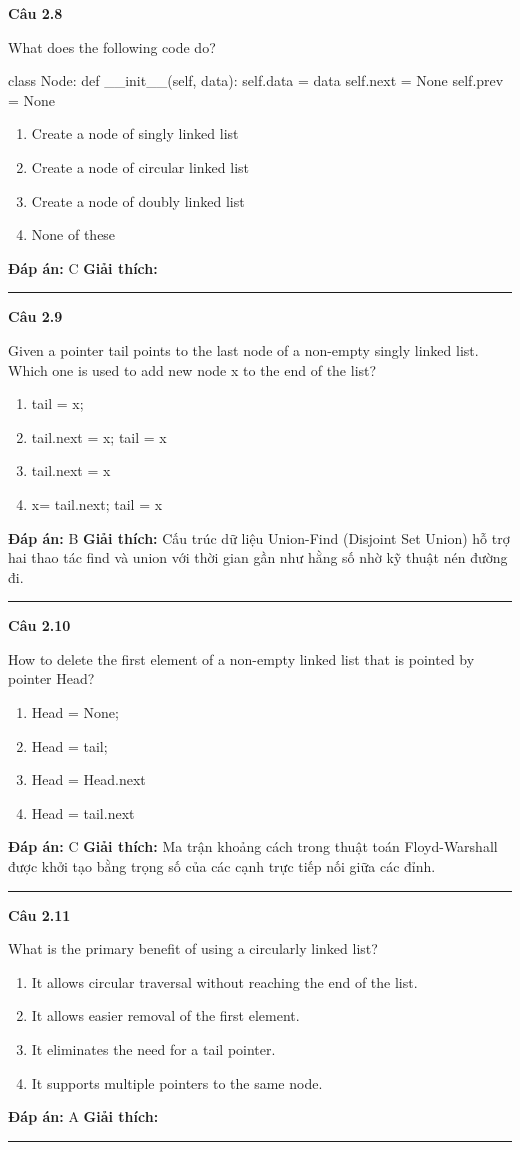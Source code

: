 \documentclass[11pt,a4paper]{article}
\newenvironment{question}[1]{%
  \par\vspace{1em}\noindent\textbf{\large Câu #1}\par\vspace{0.4em}
}{%
  \par\vspace{1em}\hrule\vspace{0.6em}
}
\newenvironment{choices}{%
  \begin{enumerate}[label=\textbf{\Alph*.},leftmargin=2.2em,itemsep=2pt,topsep=3pt]
}{%
  \end{enumerate}
}
\newcommand{\choice}{\item}
\newenvironment{codebox}{%
  \begin{tcolorbox}[colback=gray!8!white,colframe=gray!50!black,arc=1.5mm,boxrule=0.6pt,left=3mm,right=3mm,top=2.5mm,bottom=2.5mm]
  \ttfamily\small
}{%
  \end{tcolorbox}
}
\begin{document}
\begin{question}{2.8}
What does the following code do?
\begin{codebox}
class Node:
    def __init__(self, data):
        self.data = data
        self.next = None
        self.prev = None
\end{codebox}
\begin{choices}
\choice Create a node of singly linked list
\choice Create a node of circular linked list
\choice Create a node of doubly linked list
\choice None of these
\end{choices}
\textbf{Đáp án:} C
\textbf{Giải thích:} 
\end{question}

\begin{question}{2.9}
Given a pointer tail points to the last node of a non-empty singly linked list. Which one is used to add new node x to the end of the list?
\begin{choices}
\choice tail = x;
\choice tail.next = x; tail = x
\choice tail.next = x
\choice x= tail.next; tail = x
\end{choices}
\textbf{Đáp án:} B
\textbf{Giải thích:} Cấu trúc dữ liệu Union-Find (Disjoint Set Union) hỗ trợ hai thao tác find và union với thời gian gần như hằng số nhờ kỹ thuật nén đường đi.
\end{question}

\begin{question}{2.10}
How to delete the first element of a non-empty linked list that is pointed by pointer Head?
\begin{choices}
\choice Head = None;
\choice Head = tail;
\choice Head = Head.next
\choice Head = tail.next
\end{choices}
\textbf{Đáp án:} C
\textbf{Giải thích:} Ma trận khoảng cách trong thuật toán Floyd-Warshall được khởi tạo bằng trọng số của các cạnh trực tiếp nối giữa các đỉnh.
\end{question}

\begin{question}{2.11}
What is the primary benefit of using a circularly linked list?
\begin{choices}
\choice It allows circular traversal without reaching the end of the list.
\choice It allows easier removal of the first element.
\choice It eliminates the need for a tail pointer.
\choice It supports multiple pointers to the same node.
\end{choices}
\textbf{Đáp án:} A
\textbf{Giải thích:} 
\end{question}
\end{document}
